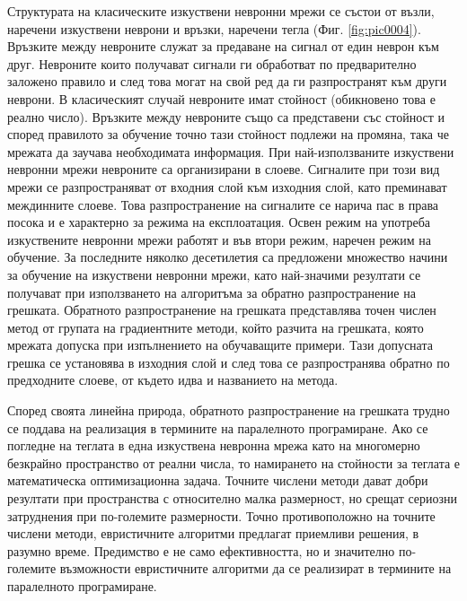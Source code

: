 \documentclass[book,14pt,oneside,openany]{memoir}
\begin{document}
Структурата на класическите изкуствени невронни мрежи се състои от възли, наречени изкуствени неврони и връзки, наречени тегла (Фиг. \ref{fig:pic0004}). Връзките между невроните служат за предаване на сигнал от един неврон към друг. Невроните които получават сигнали ги обработват по предварително заложено правило и след това могат на свой ред да ги разпространят към други неврони. В класическият случай невроните имат стойност (обикновено това е реално число). Връзките между невроните също са представени със стойност и според правилото за обучение точно тази стойност подлежи на промяна, така че мрежата да заучава необходимата информация. При най-използваните изкуствени невронни мрежи невроните са организирани в слоеве. Сигналите при този вид мрежи се разпространяват от входния слой към изходния слой, като преминават междинните слоеве. Това разпространение на сигналите се нарича пас в права посока и е характерно за режима на експлоатация. Освен режим на употреба изкуствените невронни мрежи работят и във втори режим, наречен режим на обучение. За последните няколко десетилетия са предложени множество начини за обучение на изкуствени невронни мрежи, като най-значими резултати се получават при използването на алгоритъма за обратно разпространение на грешката. Обратното разпространение на грешката представлява точен числен метод от групата на градиентните методи, който разчита на грешката, която мрежата допуска при изпълнението на обучаващите примери. Тази допусната грешка се установява в изходния слой и след това се разпространява обратно по предходните слоеве, от където идва и названието на метода. 

Според своята линейна природа, обратното разпространение на грешката трудно се поддава на реализация в термините на паралелното програмиране. Ако се погледне на теглата в една изкуствена невронна мрежа като на многомерно безкрайно пространство от реални числа, то намирането на стойности за теглата е математическа оптимизационна задача. Точните числени методи дават добри резултати при пространства с относително малка размерност, но срещат сериозни затруднения при по-големите размерности. Точно противоположно на точните числени методи, евристичните алгоритми предлагат приемливи решения, в разумно време. Предимство е не само ефективността, но и значително по-големите възможности евристичните алгоритми да се реализират в термините на паралелното програмиране. 
\end{document}
